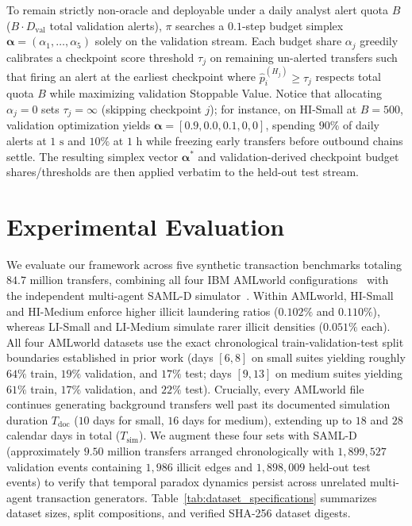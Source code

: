 \documentclass[pdflatex,sn-mathphys,Numbered]{sn-jnl}
\theoremstyle{thmstyleone}
\begin{document}
To remain strictly non-oracle and deployable under a daily analyst alert quota $B$ ($B \cdot D_{\text{val}}$ total validation alerts), $\pi$ searches a $0.1$-step budget simplex $\boldsymbol{\alpha} = (\alpha_1, \dots, \alpha_5)$ solely on the validation stream. Each budget share $\alpha_j$ greedily calibrates a checkpoint score threshold $\tau_j$ on remaining un-alerted transfers such that firing an alert at the earliest checkpoint where $\hat{p}_i^{(H_j)} \ge \tau_j$ respects total quota $B$ while maximizing validation Stoppable Value. Notice that allocating $\alpha_j = 0$ sets $\tau_j = \infty$ (skipping checkpoint $j$); for instance, on HI-Small at $B = 500$, validation optimization yields $\boldsymbol{\alpha} = [0.9, 0.0, 0.1, 0, 0]$, spending $90\%$ of daily alerts at $1\text{ s}$ and $10\%$ at $1\text{ h}$ while freezing early transfers before outbound chains settle. The resulting simplex vector $\boldsymbol{\alpha}^*$ and validation-derived checkpoint budget shares/thresholds are then applied verbatim to the held-out test stream.

\section{Experimental Evaluation}\label{sec:experiments}

We evaluate our framework across five synthetic transaction benchmarks totaling $84.7\text{ million}$ transfers, combining all four IBM AMLworld configurations~\cite{altman2023ibmaml} with the independent multi-agent SAML-D simulator~\cite{oztas2023samld}. Within AMLworld, HI-Small and HI-Medium enforce higher illicit laundering ratios ($0.102\%$ and $0.110\%$), whereas LI-Small and LI-Medium simulate rarer illicit densities ($0.051\%$ each). All four AMLworld datasets use the exact chronological train-validation-test split boundaries established in prior work (days $[6, 8]$ on small suites yielding roughly $64\%$ train, $19\%$ validation, and $17\%$ test; days $[9, 13]$ on medium suites yielding $61\%$ train, $17\%$ validation, and $22\%$ test). Crucially, every AMLworld file continues generating background transfers well past its documented simulation duration $T_{\text{doc}}$ ($10$ days for small, $16$ days for medium), extending up to $18$ and $28$ calendar days in total ($T_{\text{sim}}$). We augment these four sets with SAML-D (approximately $9.50\text{ million}$ transfers arranged chronologically with $1{,}899{,}527$ validation events containing $1{,}986$ illicit edges and $1{,}898{,}009$ held-out test events) to verify that temporal paradox dynamics persist across unrelated multi-agent transaction generators. Table~\ref{tab:dataset_specifications} summarizes dataset sizes, split compositions, and verified SHA-256 dataset digests.
\end{document}
